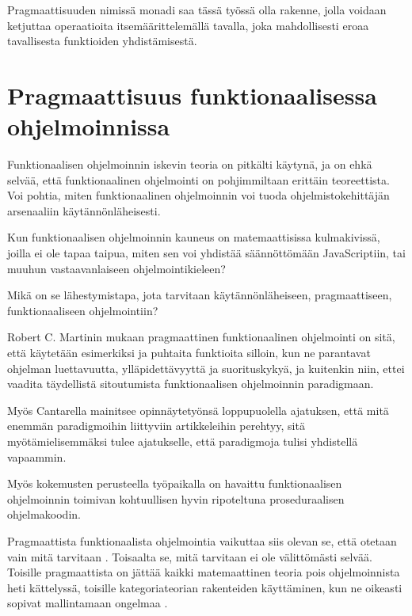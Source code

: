 Pragmaattisuuden nimissä monadi saa tässä työssä olla rakenne, jolla voidaan ketjuttaa operaatioita itsemäärittelemällä tavalla, joka mahdollisesti eroaa tavallisesta funktioiden yhdistämisestä.


\section{Pragmaattisuus funktionaalisessa ohjelmoinnissa}

Funktionaalisen ohjelmoinnin iskevin teoria on pitkälti käytynä, ja on ehkä selvää, että funktionaalinen ohjelmointi on pohjimmiltaan erittäin teoreettista. Voi pohtia, miten funktionaalinen ohjelmoinnin voi tuoda ohjelmistokehittäjän arsenaaliin käytännönläheisesti.

Kun funktionaalisen ohjelmoinnin kauneus on matemaattisissa kulmakivissä, joilla ei ole tapaa taipua, miten sen voi yhdistää säännöttömään JavaScriptiin, tai muuhun vastaavanlaiseen ohjelmointikieleen?

Mikä on se lähestymistapa, jota tarvitaan käytännönläheiseen, pragmaattiseen, funktionaaliseen ohjelmointiin?

Robert C. Martinin mukaan pragmaattinen funktionaalinen ohjelmointi on sitä, että käytetään esimerkiksi  ja puhtaita funktioita silloin, kun ne parantavat ohjelman luettavuutta, ylläpidettävyyttä ja suorituskykyä, ja kuitenkin niin, ettei vaadita täydellistä sitoutumista funktionaalisen ohjelmoinnin paradigmaan. \citep{martin2017pragmaticfp}

Myös Cantarella mainitsee opinnäytetyönsä loppupuolella ajatuksen, että mitä enemmän paradigmoihin liittyviin artikkeleihin perehtyy, sitä myötämielisemmäksi tulee ajatukselle, että paradigmoja tulisi yhdistellä vapaammin. \citep[45]{cantarella_fp_haitat}

Myös kokemusten perusteella työpaikalla on havaittu funktionaalisen ohjelmoinnin toimivan kohtuullisen hyvin ripoteltuna proseduraalisen ohjelmakoodin.

Pragmaattista funktionaalista ohjelmointia vaikuttaa siis olevan se, että otetaan vain mitä tarvitaan \cite{dear_functional_bros,martin2017pragmaticfp,cantarella_fp_haitat}. Toisaalta se, mitä tarvitaan ei ole välittömästi selvää. Toisille pragmaattista on jättää kaikki matemaattinen teoria pois ohjelmoinnista heti kättelyssä, toisille kategoriateorian rakenteiden käyttäminen, kun ne oikeasti sopivat mallintamaan ongelmaa \cite{holvikari2021category,martin2017pragmaticfp}.

